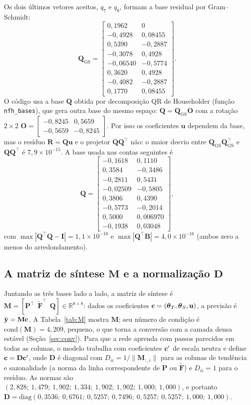 \documentclass[11pt,a4paper]{article}
\newcommand{\bP}{\mathbf{P}}\newcommand{\bF}{\mathbf{F}}\newcommand{\bFt}{\widetilde{\mathbf{F}}}\newcommand{\bQ}{\mathbf{Q}}
\newcommand{\bM}{\mathbf{M}}\newcommand{\bD}{\mathbf{D}}\newcommand{\bT}{\mathbf{T}}\newcommand{\bS}{\mathbf{S}}
\newcommand{\bR}{\mathbf{R}}\newcommand{\byh}{\hat{\mathbf{y}}}\newcommand{\bX}{\mathbf{X}}
\newcommand{\thT}{\boldsymbol{\theta}_T}\newcommand{\thS}{\boldsymbol{\theta}_S}\newcommand{\bu}{\mathbf{u}}
\newcommand{\bI}{\mathbf{I}}\newcommand{\R}{\mathbb{R}}\newcommand{\En}{\mathcal{E}}
\begin{document}
Os dois últimos vetores aceitos, $q_7$ e $q_8$, formam a base residual por Gram--Schmidt:
\[\bQ_{\mathrm{GS}}=\begin{bmatrix}0,1962 & 0 \\ -0,4928 & 0,08455 \\ 0,5390 & -0,2887 \\ -0,3078 & 0,4928 \\ -0,06540 & -0,5774 \\ 0,3620 & 0,4928 \\ -0,4082 & -0,2887 \\ 0,1770 & 0,08455\end{bmatrix}.\]
O código usa a base $\bQ$ obtida por decomposição QR de Householder (função \texttt{nfh\_bases}), que gera outra base do mesmo espaço: $\bQ=\bQ_{\mathrm{GS}}\mathbf O$ com a rotação $2\times2$ $\mathbf O=\begin{bmatrix}-0,8245 & 0,5659 \\ -0,5659 & -0,8245\end{bmatrix}$. Por isso os coeficientes $\bu$ dependem da base, mas o resíduo $\bR=\bQ\bu$ e o projetor $\bQ\bQ^\top$ não: o maior desvio entre $\bQ_{\mathrm{GS}}\bQ_{\mathrm{GS}}^\top$ e $\bQ\bQ^\top$ é $7,9\times 10^{-15}$. A base usada nas contas seguintes é
\[\bQ=\begin{bmatrix}-0,1618 & 0,1110 \\ 0,3584 & -0,3486 \\ -0,2811 & 0,5431 \\ -0,02509 & -0,5805 \\ 0,3806 & 0,4390 \\ -0,5773 & -0,2014 \\ 0,5000 & 0,006970 \\ -0,1938 & 0,03048\end{bmatrix},\]
com $\max|\bQ^\top\bQ-\bI|=1,1\times 10^{-16}$ e $\max|\bQ^\top\mathbf B|=4,0\times 10^{-16}$ (ambos zero a menos do arredondamento).

\subsection{A matriz de síntese $\bM$ e a normalização $\bD$}

Juntando as três bases lado a lado, a matriz de síntese é $\bM=[\bP^\top\ \ \bFt^\top\ \ \bQ]\in\R^{8\times8}$: dados os coeficientes $\bc=(\thT,\thS,\bu)$, a previsão é $\byh=\bM\bc$. A Tabela~\ref{tab:M} mostra $\bM$; seu número de condição é $\mathrm{cond}(\bM)=4,209$, pequeno, o que torna a conversão com a camada densa estável (Seção~\ref{sec:conv}). Para que a rede aprenda com passos parecidos em todas as colunas, o modelo trabalha com coeficientes $\mathbf{c}'$ de escala neutra e define $\bc=\bD\bc'$, onde $\bD$ é diagonal com $D_{ii}=1/\|\bM_{:,i}\|$ para as colunas de tendência e sazonalidade (a norma da linha correspondente de $\bP$ ou $\bFt$) e $D_{ii}=1$ para o resíduo. As normas são $(2,828;\allowbreak\ 1,479;\allowbreak\ 1,902;\allowbreak\ 1,334;\allowbreak\ 1,902;\allowbreak\ 1,902;\allowbreak\ 1,000;\allowbreak\ 1,000)$, e portanto $\bD=\mathrm{diag}(0,3536;\allowbreak\ 0,6761;\allowbreak\ 0,5257;\allowbreak\ 0,7496;\allowbreak\ 0,5257;\allowbreak\ 0,5257;\allowbreak\ 1,000;\allowbreak\ 1,000)$.
\end{document}
